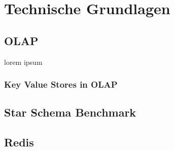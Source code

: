 \chapter{Technische Grundlagen}
\section{OLAP}
lorem ipsum
















\subsection{Key Value Stores in OLAP}
\section{Star Schema Benchmark}
\section{Redis}